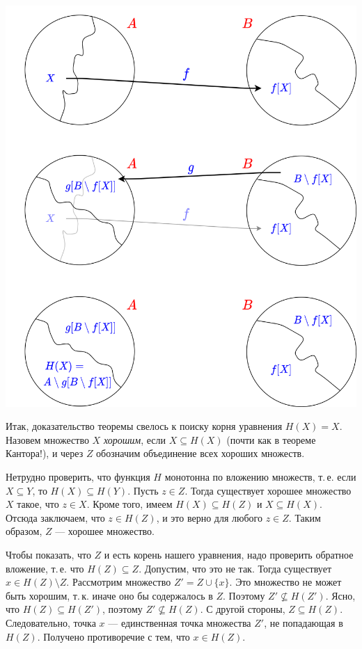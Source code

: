 \begin{enumerate}
\begin{center}
\includegraphics[scale=0.2]{CBS1.png}
\end{center}

Итак, доказательство теоремы свелось к поиску корня уравнения $H(X)=X$. Назовем
множество $X$ {\itshape хорошим}, если $X\subseteq H(X)$ (почти как в теореме Кантора!), и через $Z$ обозначим
объединение всех хороших множеств.

Нетрудно проверить, что функция $H$ монотонна по вложению множеств, т.\,е.
если $X\subseteq Y$, то $H(X)\subseteq H(Y)$. Пусть $z\in Z$. Тогда существует
хорошее множество $X$ такое, что $z\in X$. Кроме того, имеем $H(X)\subseteq
H(Z)$ и $X\subseteq H(X)$. Отсюда заключаем, что $z\in H(Z)$, и это верно
для любого $z\in Z$. Таким образом, $Z$ --- хорошее множество.

Чтобы показать, что $Z$ и есть корень нашего уравнения, надо проверить обратное
вложение, т.\,е. что $H(Z)\subseteq Z$. Допустим, что это не так. Тогда
существует $x\in H(Z)\setminus Z$. Рассмотрим множество $Z'=Z\cup\{x\}$.
Это множество не может быть хорошим, т.\,к. иначе оно бы содержалось в $Z$.
Поэтому $Z'\not\subseteq H(Z')$. Ясно, что $H(Z)\subseteq H(Z')$, поэтому
$Z'\not\subseteq H(Z)$. С другой стороны, $Z\subseteq H(Z)$. Следовательно,
точка $x$ --- единственная точка множества $Z'$, не попадающая в $H(Z)$.
Получено противоречие с тем, что $x\in H(Z)$.


\end{enumerate}
